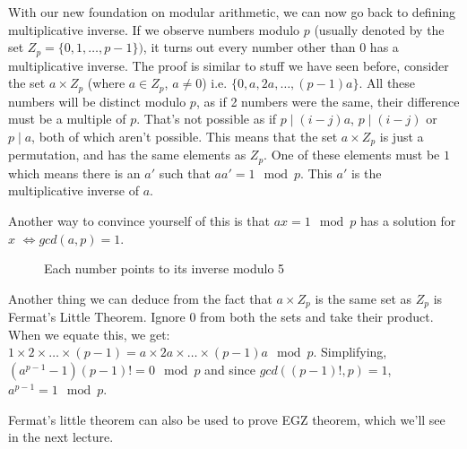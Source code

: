 \documentclass[a4paper,10pt]{article}
\theoremstyle{definition} %
\begin{document}
    With our new foundation on modular arithmetic, we can now go back to defining multiplicative
    inverse. If we observe numbers modulo $p$ (usually denoted by the set $Z_p = \{0,1,\dots,p-1\})$,
    it turns out every number other than $0$ has a multiplicative inverse. The proof is similar to 
    stuff we have seen before, consider the set $a \times Z_p$ (where $a \in Z_p$, $a \neq 0$) 
    i.e. $\{0,a,2a,\dots,(p-1)a\}$.
    All these numbers will be distinct modulo $p$, as if 2 numbers were the same, their difference
    must be a multiple of $p$. That's not possible as if $p \mid (i-j)a$, $p \mid (i-j)$ or $p \mid a$,
    both of which aren't possible. This means that the set $a \times Z_p$ is just a permutation,
    and has the same elements as $Z_p$. One of these elements must be $1$ which means there
    is an $a'$ such that $aa' = 1 \mod p$. This $a'$ is the multiplicative inverse of $a$.

    Another way to convince yourself of this is that $ax = 1 \mod p$ has a solution for $x$
    $\iff gcd(a,p) = 1$.

    
    \begin{figure}[ht]
    \centering

    \caption{Each number points to its inverse modulo 5}
    \end{figure}

    Another thing we can deduce from the fact that $a \times Z_p$ is the same set as 
    $Z_p$ is Fermat's Little Theorem. Ignore $0$ from both the sets and take their product.
    When we equate this, we get: $1 \times 2 \times \dots \times (p-1)
    = a \times 2a \times \dots \times (p-1)a \mod p$. Simplifying, 
    $(a^{p-1}-1)(p-1)! = 0 \mod p$ and since $gcd((p-1)!,p)=1$, $a^{p-1}=1 \mod p$. 

    Fermat's little theorem can also be used to prove EGZ theorem, which we'll see in the next
    lecture.
\end{document}
